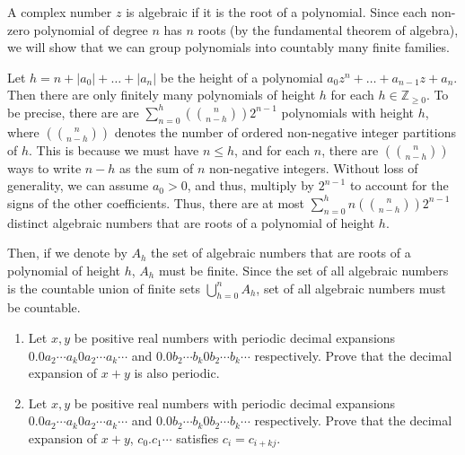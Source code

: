 \documentclass[12 pt, letterpaper]{hmcpset}
\begin{document}
\begin{solution}
	A complex number $z$ is algebraic if it is the root of a polynomial. Since each non-zero polynomial of degree $n$ has $n$ roots (by the fundamental theorem of algebra), we will show that we can group polynomials into countably many finite families.

	Let $h = n + \lvert a_{0} \rvert + \dots + \lvert a_{n} \rvert$ be the height of a polynomial $a_{0} z^{n} + \dots + a_{n - 1} z + a_{n}$. Then there are only finitely many polynomials of height $h$ for each $h \in \mathbb{Z}_{\ge 0}$. To be precise, there are are $\sum_{n = 0}^{h} \left ( \binom{n}{n - h} \right ) 2^{n - 1}$ polynomials with height $h$, where $\left ( \binom{n}{n - h} \right )$ denotes the number of ordered non-negative integer partitions of $h$. This is because we must have $n \le h$, and for each $n$, there are $\left ( \binom{n}{n - h} \right )$ ways to write $n - h$ as the sum of $n$ non-negative integers. Without loss of generality, we can assume $a_{0} > 0$, and thus, multiply by $2^{n - 1}$ to account for the signs of the other coefficients. Thus, there are at most $\sum_{n = 0}^{h} n \left ( \binom{n}{n - h} \right ) 2^{n - 1}$ distinct algebraic numbers that are roots of a polynomial of height $h$. 

	Then, if we denote by $A_{h}$ the set of algebraic numbers that are roots of a polynomial of height $h$,  $A_{h}$ must be finite. Since the set of all algebraic numbers is the countable union of finite sets $\bigcup_{h = 0}^{n} A_{h}$, set of all algebraic numbers must be countable.
\end{solution}

\pagebreak

\begin{problem}[5.]
	\begin{enumerate}
		\item Let $x, y$ be positive real numbers with periodic decimal expansions $0.0a_{2} \cdots a_{k} 0 a_{2} \cdots a_{k} \cdots$ and $0.0 b_{2} \cdots b_{k} 0 b_{2} \cdots b_{k} \cdots$ respectively. Prove that the decimal expansion of $x + y$ is also periodic.
		\item Let $x, y$ be positive real numbers with periodic decimal expansions $0.0 a_{2} \cdots a_{k} 0 a_{2} \cdots a_{k} \cdots$ and $0.0 b_{2} \cdots b_{k} 0 b_{2} \cdots b_{k} \cdots$ respectively. Prove that the decimal expansion of $x + y$, $c_{0}.c_{1} \cdots$ satisfies $c_{i} = c_{i + kj}$.
	\end{enumerate}
\end{problem}
\end{document}
